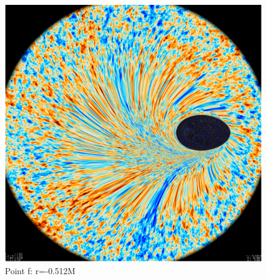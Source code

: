 \documentclass[oneside,openright,frontopenright, singlespacing]{dmathesis}
\begin{document}
\vspace{1em}
\begin{figure}[!ht]
	\centering
	\includegraphics[width=0.7\linewidth]{img/plunging6}
	\caption{Point f: r=-0.512M}
	\label{fig:Figure6.6}
\end{figure}
\end{document}
